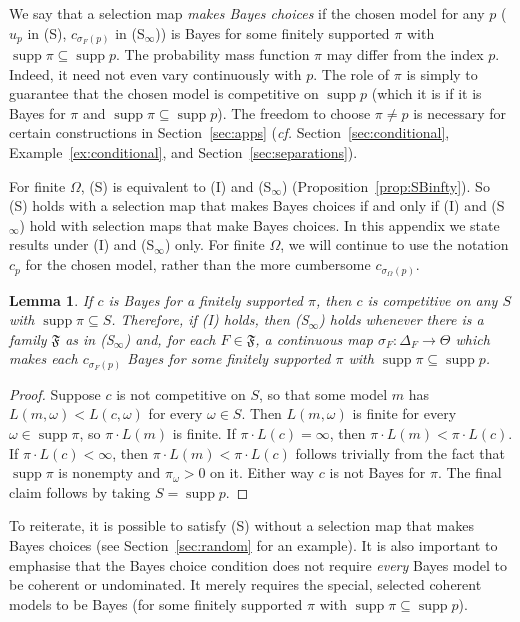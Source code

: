 \documentclass[11pt]{article}
\newtheorem{lemma}[theorem]{Lemma}
\theoremstyle{definition}
\theoremstyle{remark}
\newcommand{\F}{\mathfrak F}
\newcommand{\supp}{\operatorname{supp}}
\begin{document}
We say that a selection map \emph{makes Bayes choices} if the chosen model for any $p$ ($u_p$ in (S), $c_{\sigma_F(p)}$ in (S$_\infty$)) is Bayes for some finitely supported $\pi$ with $\supp\pi\subseteq\supp p$. The probability mass function $\pi$ may differ from the index $p$. Indeed, it need not even vary continuously with $p$. The role of $\pi$ is simply to guarantee that the chosen model is competitive on $\supp p$ (which it is if it is Bayes for $\pi$ and $\supp\pi\subseteq\supp p$). The freedom to choose $\pi\ne p$ is necessary for certain constructions in Section~\ref{sec:apps} (\textit{cf.} Section~\ref{sec:conditional}, Example~\ref{ex:conditional}, and Section~\ref{sec:separations}).

For finite $\Omega$, (S) is equivalent to (I) and (S$_\infty$) (Proposition~\ref{prop:SBinfty}). So (S) holds with a selection map that makes Bayes choices if and only if (I) and (S$_\infty$) hold with selection maps that make Bayes choices. In this appendix we state results under (I) and (S$_\infty$) only. For finite $\Omega$, we will continue to use the notation $c_p$ for the chosen model, rather than the more cumbersome $c_{\sigma_\Omega(p)}$. 


\begin{lemma}\label{lem:bayes-choice}
If $c$ is Bayes for a finitely supported $\pi$, then $c$ is competitive on any $S$ with $\supp\pi\subseteq S$. Therefore, if (I) holds, then (S$_\infty$) holds whenever there is a family $\F$ as in (S$_\infty$) and, for each $F\in\F$, a continuous map $\sigma_F:\Delta_F\to\Theta$ which makes each $c_{\sigma_F(p)}$ Bayes for some finitely supported $\pi$ with $\supp\pi\subseteq\supp p$.
\end{lemma}
\begin{proof}
Suppose $c$ is not competitive on $S$, so that some model $m$ has $L(m,\omega)<L(c,\omega)$ for every $\omega\in S$. Then $L(m,\omega)$ is finite for every $\omega\in\supp\pi$, so $\pi\cdot L(m)$ is finite. If $\pi\cdot L(c)=\infty$, then $\pi\cdot L(m)<\pi\cdot L(c)$. If $\pi\cdot L(c)<\infty$, then $\pi\cdot L(m)<\pi\cdot L(c)$ follows trivially from the fact that $\supp\pi$ is nonempty and $\pi_\omega>0$ on it. Either way $c$ is not Bayes for $\pi$. The final claim follows by taking $S=\supp p$.
\end{proof}

To reiterate, it is possible to satisfy (S) without a selection map that makes Bayes choices (see Section~\ref{sec:random} for an example). It is also important to emphasise that the Bayes choice condition does not require \emph{every} Bayes model to be coherent or undominated. It merely requires the special, selected coherent models to be Bayes (for some finitely supported $\pi$ with $\supp\pi\subseteq\supp p$). 
\end{document}
